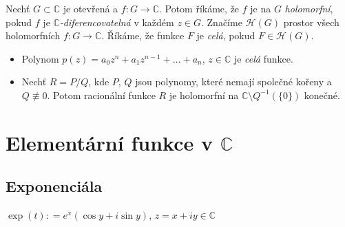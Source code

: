 
\begin{definition}
Nechť $G\subset \mathbb{C}$ je otevřená a $f \colon G \to \mathbb{C}$.
Potom říkáme, že $f$ je na $G$ \emph{holomorfní}, pokud $f$ je  $\mathbb{C}$\emph{-diferencovatelná} v každém $z\in {G}$. Značíme $\mathcal{H}(G)$ prostor všech holomorfních $f \colon G \to \mathbb{C}$. Říkáme, že funkce $F$ je \emph{celá}, pokud $F\in \mathcal{H}(G)$.
\end{definition}

\begin{example}\mbox{}
\begin{itemize}
    \item Polynom $p(z) = a_0z^{n}+a_1z^{n-1}+...+a_n$, $z\in \mathbb{C}$ je \emph{celá} funkce.
    \item Nechť $R=P/Q$, kde $P$, $Q$ jsou polynomy, které nemají společné kořeny a $Q\not\equiv 0$. Potom racionální funkce $R$ je holomorfní na $\mathbb{C}\setminus Q^{-1}(\{0\})$ konečné.
\end{itemize}    
\end{example}


\section{Elementární funkce v \texorpdfstring{$\mathbb{C}$}{Lg}}
\subsection{Exponenciála}

\begin{definition}
$\exp(t)\colon=e^{x}(\cos y + i\sin y)$, $z=x+i y\in \mathbb{C}$
\end{definition}

